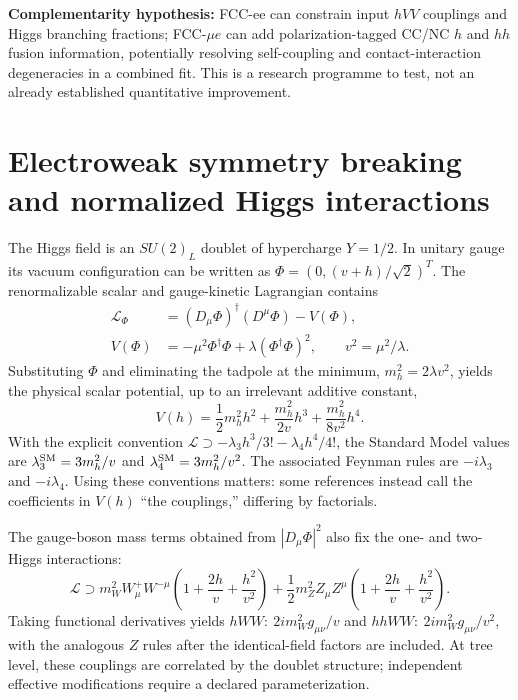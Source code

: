 \documentclass[12pt,a4paper]{article}
\newcommand{\newnote}{\clearpage}
\begin{document}
\textbf{Complementarity hypothesis:} FCC-ee can constrain input $hVV$ couplings and Higgs branching fractions; FCC-$\mu e$ can add polarization-tagged CC/NC $h$ and $hh$ fusion information, potentially resolving self-coupling and contact-interaction degeneracies in a combined fit. This is a research programme to test, not an already established quantitative improvement.



\newnote

\section{Electroweak symmetry breaking and normalized Higgs interactions}
The Higgs field is an $SU(2)_L$ doublet of hypercharge $Y=1/2$. In unitary gauge its vacuum configuration can be written as $\Phi=(0,(v+h)/\sqrt2)^T$. The renormalizable scalar and gauge-kinetic Lagrangian contains
\begin{align}
\mathcal L_\Phi&=(D_\mu\Phi)^\dagger(D^\mu\Phi)-V(\Phi),\\
V(\Phi)&=-\mu^2\Phi^\dagger\Phi+\lambda(\Phi^\dagger\Phi)^2,
\qquad v^2=\mu^2/\lambda.
\end{align}
Substituting $\Phi$ and eliminating the tadpole at the minimum, $m_h^2=2\lambda v^2$, yields the physical scalar potential, up to an irrelevant additive constant,
\begin{equation}\label{eq:potential}
V(h)=\frac12m_h^2h^2+\frac{m_h^2}{2v}h^3+\frac{m_h^2}{8v^2}h^4.
\end{equation}
With the explicit convention $\mathcal L\supset -\lambda_3h^3/3!-\lambda_4h^4/4!$, the Standard Model values are $\lambda_3^{\rm SM}=3m_h^2/v$ and $\lambda_4^{\rm SM}=3m_h^2/v^2$. The associated Feynman rules are $-i\lambda_3$ and $-i\lambda_4$. Using these conventions matters: some references instead call the coefficients in $V(h)$ ``the couplings,'' differing by factorials.

The gauge-boson mass terms obtained from $|D_\mu\Phi|^2$ also fix the one- and two-Higgs interactions:
\begin{equation}\label{eq:gaugeh}
\mathcal L\supset m_W^2W_\mu^+W^{-\mu}\left(1+\frac{2h}{v}+\frac{h^2}{v^2}\right)
+\frac12m_Z^2Z_\mu Z^\mu\left(1+\frac{2h}{v}+\frac{h^2}{v^2}\right).
\end{equation}
Taking functional derivatives yields $hWW:\ 2im_W^2g_{\mu\nu}/v$ and $hhWW:\ 2im_W^2g_{\mu\nu}/v^2$, with the analogous $Z$ rules after the identical-field factors are included. At tree level, these couplings are correlated by the doublet structure; independent effective modifications require a declared parameterization.
\end{document}

